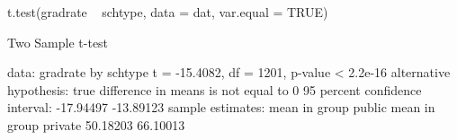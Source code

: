 \begin{Schunk}
\begin{Sinput}
 t.test(gradrate ~ schtype, data = dat, var.equal = TRUE)
\end{Sinput}
\begin{Soutput}
	Two Sample t-test

data:  gradrate by schtype
t = -15.4082, df = 1201, p-value < 2.2e-16
alternative hypothesis: true difference in means is not equal to 0
95 percent confidence interval:
 -17.94497 -13.89123
sample estimates:
 mean in group public mean in group private 
             50.18203              66.10013 
\end{Soutput}
\end{Schunk}
